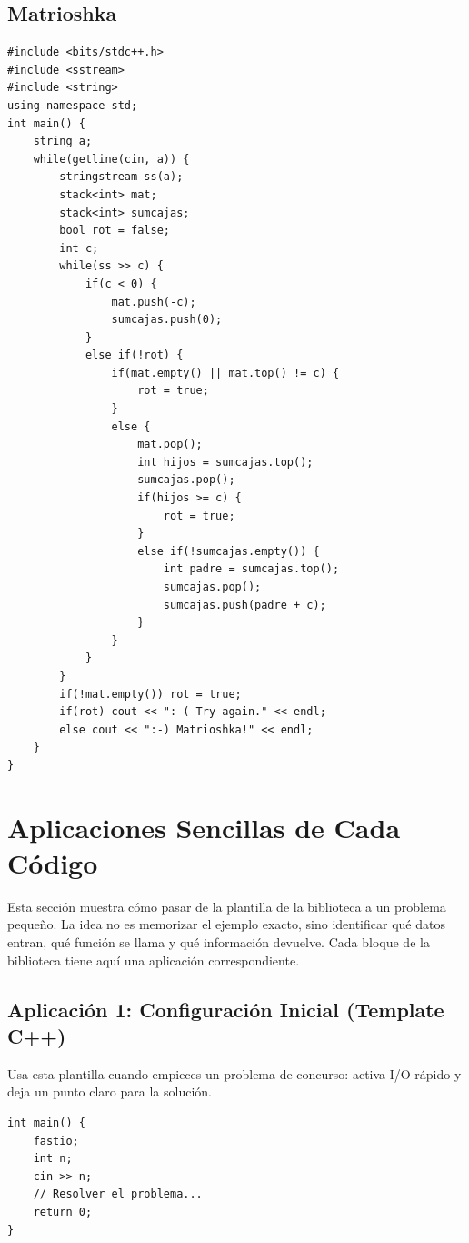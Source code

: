 \documentclass[10pt,twocolumn,letterpaper]{report}
\begin{document}
\section{Matrioshka}
\begin{lstlisting}
#include <bits/stdc++.h>
#include <sstream>
#include <string>
using namespace std;
int main() {
    string a;
    while(getline(cin, a)) {
        stringstream ss(a);
        stack<int> mat;
        stack<int> sumcajas;
        bool rot = false;
        int c;
        while(ss >> c) {
            if(c < 0) {
                mat.push(-c);
                sumcajas.push(0);
            }
            else if(!rot) {
                if(mat.empty() || mat.top() != c) {
                    rot = true;
                }
                else {
                    mat.pop();
                    int hijos = sumcajas.top();
                    sumcajas.pop();
                    if(hijos >= c) {
                        rot = true;
                    }
                    else if(!sumcajas.empty()) {
                        int padre = sumcajas.top();
                        sumcajas.pop();
                        sumcajas.push(padre + c);
                    }
                }
            }
        }
        if(!mat.empty()) rot = true;
        if(rot) cout << ":-( Try again." << endl;
        else cout << ":-) Matrioshka!" << endl;
    }
}
\end{lstlisting}

\chapter{Aplicaciones Sencillas de Cada Código}
Esta sección muestra cómo pasar de la plantilla de la biblioteca a un problema
pequeño. La idea no es memorizar el ejemplo exacto, sino identificar qué datos
entran, qué función se llama y qué información devuelve. Cada bloque de la
biblioteca tiene aquí una aplicación correspondiente.

\section{Aplicación 1: Configuración Inicial (Template C++)}
Usa esta plantilla cuando empieces un problema de concurso: activa I/O rápido y deja un punto claro para la solución.

\begin{lstlisting}
int main() {
    fastio;
    int n;
    cin >> n;
    // Resolver el problema...
    return 0;
}
\end{lstlisting}
\end{document}
